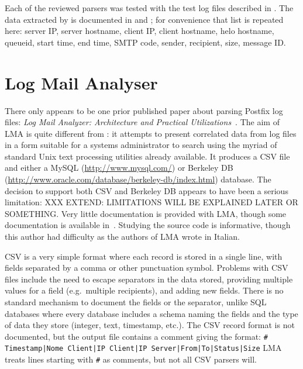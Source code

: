 Each of the reviewed parsers was tested with the \numberOFlogFILES{} test
log files described in .  The data extracted
by \parsername{} is documented in  and
; for convenience that list is repeated here:
server \gls{IP}, server hostname, client \gls{IP}, client hostname, helo
hostname, queueid, start time, end time, \gls{SMTP} code, sender,
recipient, size, message ID\@.

\section{Log Mail Analyser}

\label{prior art}

There only appears to be one prior published paper about parsing Postfix
log files: \textit{Log Mail Analyzer: Architecture and Practical
Utilizations\/}~\cite{log-mail-analyser}.  The aim of \gls{LMA} is quite
different from \parsername{}: it attempts to present correlated data from
log files in a form suitable for a systems administrator to search using
the myriad of standard Unix text processing utilities already available.
It produces a \gls{CSV} file and either a MySQL
(\url{http://www.mysql.com/}) or Berkeley DB
(\url{http://www.oracle.com/database/berkeley-db/index.html}) database.
The decision to support both \gls{CSV} and Berkeley DB appears to have been
a serious limitation: XXX EXTEND\@: LIMITATIONS WILL BE EXPLAINED LATER OR
SOMETHING\@.  Very little documentation is provided with \gls{LMA}, though
some documentation is available in~\cite{log-mail-analyser}.  Studying the
source code is informative, though this author had difficulty as the
authors of \gls{LMA} wrote in Italian.

\gls{CSV} is a very simple format where each record is stored in a single
line, with fields separated by a comma or other punctuation symbol.
Problems with \gls{CSV} files include the need to escape separators in the
data stored, providing multiple values for a field (e.g.\ multiple
recipients), and adding new fields.  There is no standard mechanism to
document the fields or the separator, unlike \gls{SQL} databases where
every database includes a schema naming the fields and the type of data
they store (integer, text, timestamp, etc.).  The \gls{CSV} record format
is not documented, but the output file contains a comment giving the
format:\newline{} \texttt{\# Timestamp|Nome Client|IP Client|IP
Server|From|To|Status|Size} \newline{}\gls{LMA} treats lines starting with
\texttt{\#} as comments, but not all \gls{CSV} parsers will.

